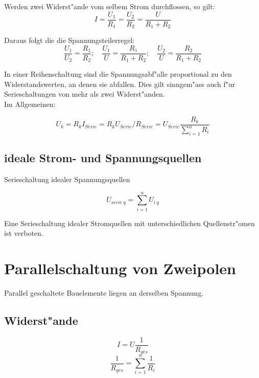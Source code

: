 \documentclass[german, 10pt, a4paper, headsepline]{scrreprt}
\theoremstyle{remark}
\begin{document}
Werden zwei Widerst"ande vom selbem Strom durchflossen, so gilt:
\begin{displaymath}
	I = \frac{U_1}{R_1}=\frac{U_2}{R_2}=\frac{U}{R_1+R_2}
\end{displaymath}

Daraus folgt die die Spannungsteilerregel:
\begin{displaymath}
	\frac{U_1}{U_2}=\frac{R_1}{R_2};\quad \frac{U_1}{U}=\frac{R_1}{R_1+R_2};\quad \frac{U_2}{U}=\frac{R_2}{R_1+R_2}
\end{displaymath}

In einer Reihenschaltung sind die Spannungsabf"alle proportional zu den Widerstandswerten, an denen sie abfallen. Dies gilt sinngem"ass auch f"ur Serieschaltungen von mehr als zwei Widerst"anden.\\

Im Allgemeinen:

\begin{displaymath}
	U_k=R_k I_{Serie}=R_k U_{Serie} / R_{Serie} = U_{Serie}\frac{R_k}{\sum^n_{i=1}R_i}
\end{displaymath}

\subsection{ideale Strom- und Spannungsquellen}

Serieschaltung idealer Spannungsquellen

\begin{displaymath}
	U_{serie\:q}=\sum^n_{i=1}U_{i\:q}
\end{displaymath}

Eine Serieschaltung idealer Stromquellen mit unterschiedlichen Quellenstr"omen ist verboten.


\section{Parallelschaltung von Zweipolen}


Parallel geschaltete Bauelemente liegen an derselben Spannung.

\subsection{Widerst"ande}

\begin{displaymath}
	I=U\frac{1}{R_{ges}}
\end{displaymath}
\begin{displaymath}
	\frac{1}{R_{ges}}=\sum^n_{i=1}\frac{1}{R_i}
\end{displaymath}
\end{document}
